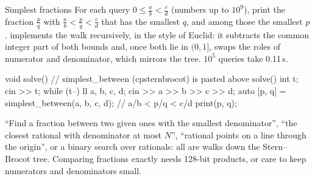 
\begin{problem}{Simplest fractions}
For each query $0 \le \frac ab < \frac cd$ (numbers up to $10^9$), print the fraction $\frac pq$ with $\frac ab < \frac pq < \frac cd$
that has the smallest $q$, and among those the smallest $p$.
\solution {} implements the walk recursively, in the style of Euclid: it subtracts the common integer part of
both bounds and, once both lie in $(0, 1]$, swaps the roles of numerator and denominator, which mirrors the tree. $10^5$ queries take
0.11\,s.
\end{problem}

\begin{code}
void solve() {  // simplest_between (cpsternbrocot) is pasted above solve()
    int t;
    cin >> t;
    while (t--) {
        ll a, b, c, d;
        cin >> a >> b >> c >> d;
        auto [p, q] = simplest_between(a, b, c, d);  // a/b < p/q < c/d
        print(p, q);
    }
}
\end{code}

\begin{recognize}
``Find a fraction between two given ones with the smallest denominator'', ``the closest rational with denominator at most $N$'',
``rational points on a line through the origin'', or a binary search over rationals: all are walks down the Stern--Brocot tree. Comparing
fractions exactly needs 128-bit products, or care to keep numerators and denominators small.
\end{recognize}


